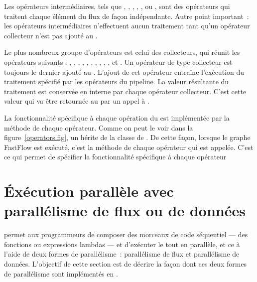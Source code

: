 Les op\'erateurs interm\'ediaires, tels que , , , , ,  ou , sont des op\'erateurs qui traitent chaque \'el\'ement du flux de fa\c{c}on ind\'ependante. Autre point important~: les op\'erateurs interm\'ediaires n'effectuent aucun traitement tant qu'un op\'erateur collecteur n'est pas ajout\'e au . 

Le plus nombreux groupe d'op\'erateurs est celui des collecteurs, qui réunit les op\'erateurs suivants : , , , , , , , , , ,  et . Un op\'erateur de type collecteur est toujours le dernier ajout\'e au . L'ajout de cet op\'erateur entra\^ine l'ex\'ecution du traitement spécifié par les opérateurs du pipeline. La valeur r\'esultante du traitement est conserv\'ee en interne par chaque op\'erateur collecteur. C'est cette valeur qui va \^etre retourn\'ee au  par un appel à .

La fonctionnalit\'e sp\'ecifique \`a chaque op\'eration du  est impl\'ement\'ee par la m\'ethode  de chaque op\'erateur. Comme on peut le voir dans la figure~\ref{operators.fig}, un  h\'erite de la classe  de . De cette fa\c{c}on, lorsque le graphe FastFlow est exécuté, c'est la méthode  de chaque op\'erateur qui est appel\'ee. C'est ce qui permet de spécifier la fonctionnalit\'e spécifique à chaque opérateur 








\section{\'Ex\'ecution parall\`ele avec parall\'elisme de flux ou de donn\'ees}

 permet aux programmeurs de composer des morceaux de code s\'equentiel --- des fonctions ou expressions lambdas --- et d'ex\'ecuter le tout en parall\`ele, et ce à l'aide de deux formes de parallélisme~:
parall\'elisme de flux et parall\'elisme de donn\'ees.
%
L'objectif de cette section est de d\'ecrire la façon dont ces deux formes de parall\'elisme sont impl\'ement\'es en . 

